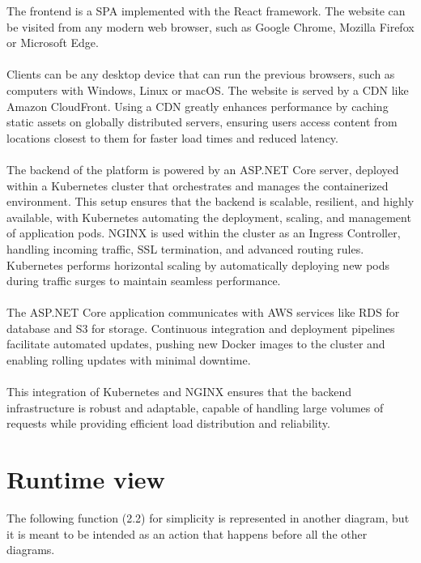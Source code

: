 The frontend is a SPA implemented with the React framework. The website can be visited from any modern web browser, such as Google Chrome, Mozilla Firefox or Microsoft Edge. \\ \\
Clients can be any desktop device that can run the previous browsers, such as computers with Windows, Linux or macOS.
The website is served by a CDN like Amazon CloudFront.
Using a CDN greatly enhances performance by caching static assets on globally distributed servers, ensuring users access content from locations closest to them for faster load times and reduced latency. \\ \\
The backend of the platform is powered by an ASP.NET Core server, deployed within a Kubernetes cluster that orchestrates and manages the containerized environment. This setup ensures that the backend is scalable, resilient, and highly available, with Kubernetes automating the deployment, scaling, and management of application pods. NGINX is used within the cluster as an Ingress Controller, handling incoming traffic, SSL termination, and advanced routing rules. Kubernetes performs horizontal scaling by automatically deploying new pods during traffic surges to maintain seamless performance.\\ \\
The ASP.NET Core application communicates with AWS services like RDS for database and S3 for storage. Continuous integration and deployment pipelines facilitate automated updates, pushing new Docker images to the cluster and enabling rolling updates with minimal downtime.\\ \\
This integration of Kubernetes and NGINX ensures that the backend infrastructure is robust and adaptable, capable of handling large volumes of requests while providing efficient load distribution and reliability.

\newpage


\section{Runtime view}
The following function (2.2) for simplicity is represented in another diagram, but it is meant to be intended as an action that happens before all the other diagrams.
\vspace{5mm}

